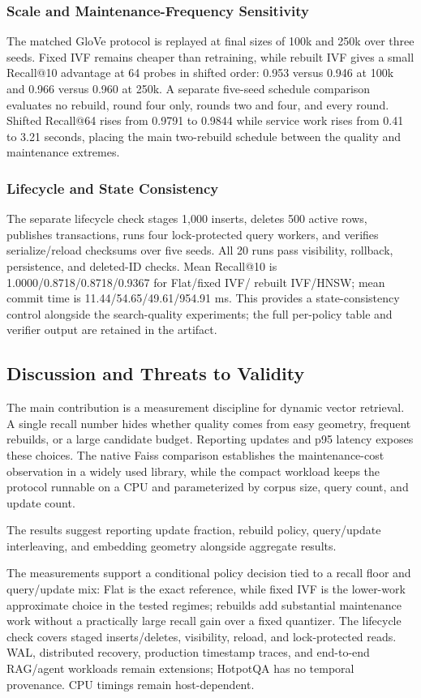 \subsubsection{Scale and Maintenance-Frequency Sensitivity}

The matched GloVe protocol is replayed at final sizes of 100k and 250k over three seeds.
Fixed IVF remains cheaper than retraining, while rebuilt IVF gives a small Recall@10
advantage at 64 probes in shifted order: 0.953 versus 0.946 at 100k and 0.966 versus
0.960 at 250k. A separate five-seed schedule comparison evaluates no rebuild, round
four only, rounds two and four, and every round. Shifted Recall@64 rises from 0.9791 to
0.9844 while service work rises from 0.41 to 3.21 seconds, placing the main two-rebuild
schedule between the quality and maintenance extremes.
\subsubsection{Lifecycle and State Consistency}
The separate lifecycle check stages 1,000 inserts, deletes 500 active rows, publishes
transactions, runs four lock-protected query workers, and verifies serialize/reload
checksums over five seeds. All 20 runs pass visibility, rollback, persistence, and
deleted-ID checks. Mean Recall@10 is 1.0000/0.8718/0.8718/0.9367 for Flat/fixed IVF/
rebuilt IVF/HNSW; mean commit time is 11.44/54.65/49.61/954.91 ms. This provides a
state-consistency control alongside the search-quality experiments; the full per-policy
table and verifier output are retained in the artifact.

\subsection{Discussion and Threats to Validity}
The main contribution is a measurement discipline for dynamic vector retrieval. A
single recall number hides whether quality comes from easy geometry, frequent rebuilds,
or a large candidate budget. Reporting updates and p95 latency exposes these choices.
The native Faiss comparison establishes the maintenance-cost observation in a widely
used library, while the compact workload keeps the protocol runnable on a CPU and
parameterized by corpus size, query count, and update count.

The results suggest reporting update fraction, rebuild policy, query/update
interleaving, and embedding geometry alongside aggregate results.

The measurements support a conditional policy decision tied to a recall floor and
query/update mix: Flat is the exact reference, while fixed IVF is the lower-work
approximate choice in the tested regimes; rebuilds add substantial maintenance work
without a practically large recall gain over a fixed quantizer. The lifecycle check
covers staged inserts/deletes, visibility, reload, and lock-protected reads. WAL,
distributed recovery, production timestamp traces, and end-to-end RAG/agent workloads
remain extensions; HotpotQA has no temporal provenance. CPU timings remain host-dependent.

